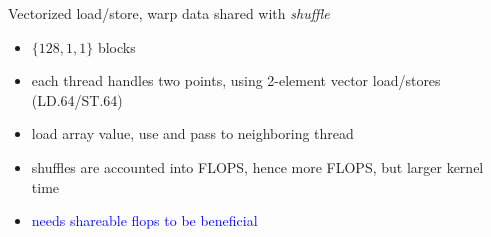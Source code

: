 \documentclass[aspectratio=169]{beamer}
\begin{document}
\begin{frame}[fragile,t]{Vectorized load/store, warp data shared with \emph{shuffle}}

\begin{minipage}[t][2.5cm]{\textwidth}
\begin{itemize}
\item $\{128, 1, 1\}$ blocks
\item each thread handles two points, using 2-element vector load/stores (LD.64/ST.64)
\item load array value, use and pass to neighboring thread
\item shuffles are accounted into FLOPS, hence more FLOPS, but larger kernel time
\item \textcolor{blue}{needs shareable flops to be beneficial}
\end{itemize}
\end{minipage}

%
\end{frame}
\end{document}
